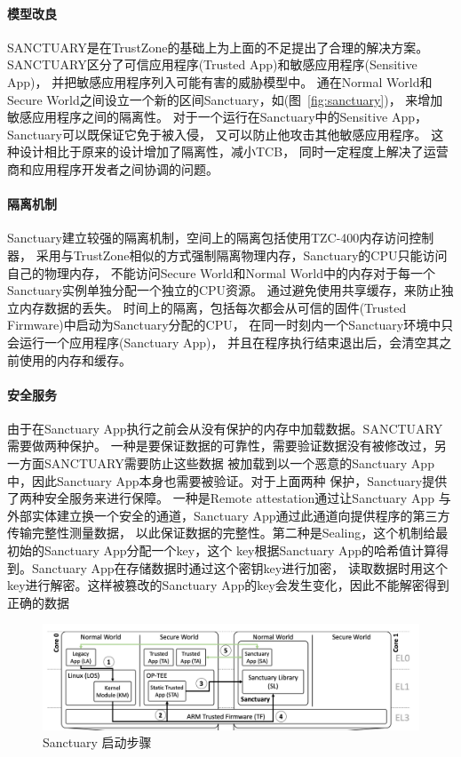 \paragraph{模型改良}
SANCTUARY是在TrustZone的基础上为上面的不足提出了合理的解决方案。 
SANCTUARY区分了可信应用程序(Trusted App)和敏感应用程序(Sensitive App)，
并把敏感应用程序列入可能有害的威胁模型中。
通在Normal World和Secure World之间设立一个新的区间Sanctuary，如(图~\ref{fig:sanctuary})，
来增加敏感应用程序之间的隔离性。
对于一个运行在Sanctuary中的Sensitive App，Sanctuary可以既保证它免于被入侵，
又可以防止他攻击其他敏感应用程序。
这种设计相比于原来的设计增加了隔离性，减小TCB，
同时一定程度上解决了运营商和应用程序开发者之间协调的问题。

\paragraph{隔离机制}
Sanctuary建立较强的隔离机制，空间上的隔离包括使用TZC-400内存访问控制器，
采用与TrustZone相似的方式强制隔离物理内存，Sanctuary的CPU只能访问自己的物理内存，
不能访问Secure World和Normal World中的内存对于每一个Sanctuary实例单独分配一个独立的CPU资源。
通过避免使用共享缓存，来防止独立内存数据的丢失。
时间上的隔离，包括每次都会从可信的固件(Trusted Firmware)中启动为Sanctuary分配的CPU，
在同一时刻内一个Sanctuary环境中只会运行一个应用程序(Sanctuary App)，
并且在程序执行结束退出后，会清空其之前使用的内存和缓存。

\paragraph{安全服务}
由于在Sanctuary App执行之前会从没有保护的内存中加载数据。SANCTUARY需要做两种保护。
一种是要保证数据的可靠性，需要验证数据没有被修改过，另一方面SANCTUARY需要防止这些数据
被加载到以一个恶意的Sanctuary App中，因此Sanctuary App本身也需要被验证。对于上面两种
保护，Sanctuary提供了两种安全服务来进行保障。 一种是Remote attestation通过让Sanctuary App
与外部实体建立换一个安全的通道，Sanctuary App通过此通道向提供程序的第三方传输完整性测量数据，
以此保证数据的完整性。第二种是Sealing，这个机制给最初始的Sanctuary App分配一个key，这个
key根据Sanctuary App的哈希值计算得到。Sanctuary App在存储数据时通过这个密钥key进行加密，
读取数据时用这个key进行解密。这样被篡改的Sanctuary App的key会发生变化，因此不能解密得到
正确的数据

\begin{figure}
    \centering
    \includegraphics[scale=0.35]{Figures/trustzone/step.png}
    \decoRule
    \caption{Sanctuary 启动步骤}
    \label{fig:step}
\end{figure}

